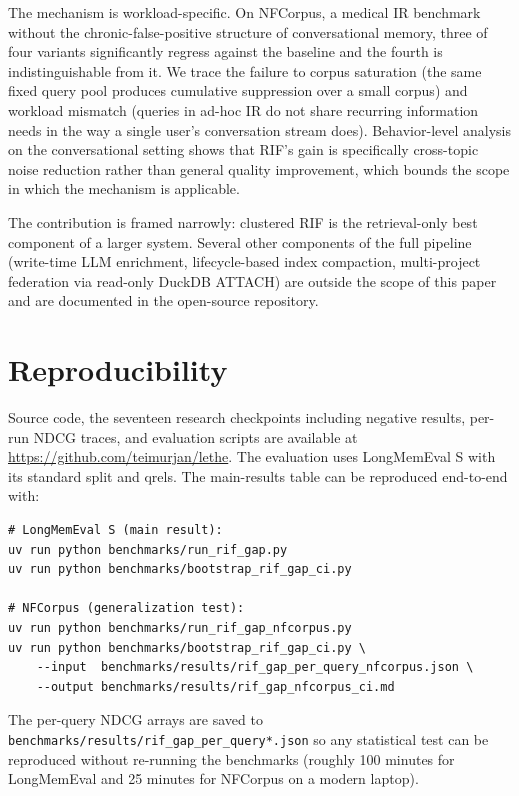 \documentclass[11pt,a4paper]{article}
\begin{document}
The mechanism is workload-specific. On NFCorpus, a medical IR benchmark without the chronic-false-positive structure of conversational memory, three of four variants significantly regress against the baseline and the fourth is indistinguishable from it. We trace the failure to corpus saturation (the same fixed query pool produces cumulative suppression over a small corpus) and workload mismatch (queries in ad-hoc IR do not share recurring information needs in the way a single user's conversation stream does). Behavior-level analysis on the conversational setting shows that RIF's gain is specifically cross-topic noise reduction rather than general quality improvement, which bounds the scope in which the mechanism is applicable.

The contribution is framed narrowly: clustered RIF is the retrieval-only best component of a larger system. Several other components of the full pipeline (write-time LLM enrichment, lifecycle-based index compaction, multi-project federation via read-only DuckDB ATTACH) are outside the scope of this paper and are documented in the open-source repository.

\section*{Reproducibility}

Source code, the seventeen research checkpoints including negative results, per-run NDCG traces, and evaluation scripts are available at \url{https://github.com/teimurjan/lethe}. The evaluation uses LongMemEval S with its standard split and qrels. The main-results table can be reproduced end-to-end with:
\begin{verbatim}
# LongMemEval S (main result):
uv run python benchmarks/run_rif_gap.py
uv run python benchmarks/bootstrap_rif_gap_ci.py

# NFCorpus (generalization test):
uv run python benchmarks/run_rif_gap_nfcorpus.py
uv run python benchmarks/bootstrap_rif_gap_ci.py \
    --input  benchmarks/results/rif_gap_per_query_nfcorpus.json \
    --output benchmarks/results/rif_gap_nfcorpus_ci.md
\end{verbatim}
The per-query NDCG arrays are saved to \texttt{benchmarks/results/rif\_gap\_per\_query*.json} so any statistical test can be reproduced without re-running the benchmarks (roughly 100 minutes for LongMemEval and 25 minutes for NFCorpus on a modern laptop).
\end{document}
